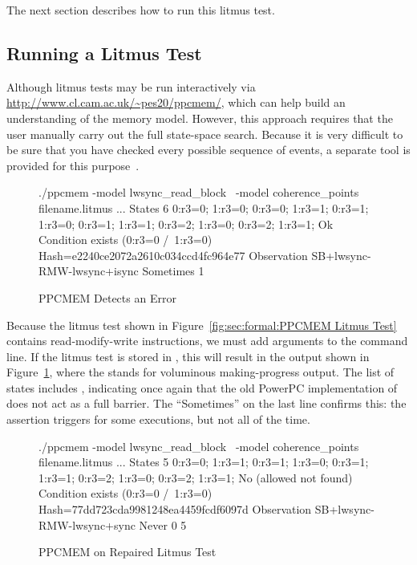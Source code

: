 The next section describes how to run this litmus test.

\subsection{Running a Litmus Test}
\label{sec:formal:Running a Litmus Test}

Although litmus tests may be run interactively via
\url{http://www.cl.cam.ac.uk/~pes20/ppcmem/}, which can help build an
understanding of the memory model.
However, this approach requires that the user manually carry out the
full state-space search.
Because it is very difficult to be sure that you have checked every
possible sequence of events, a separate tool is provided for this
purpose~\cite{PaulEMcKenney2011ppcmem}.

\begin{figure}[tbp]
{ \scriptsize
\begin{verbbox}
./ppcmem -model lwsync_read_block \
         -model coherence_points filename.litmus
...
States 6
0:r3=0; 1:r3=0;
0:r3=0; 1:r3=1;
0:r3=1; 1:r3=0;
0:r3=1; 1:r3=1;
0:r3=2; 1:r3=0;
0:r3=2; 1:r3=1;
Ok
Condition exists (0:r3=0 /\ 1:r3=0)
Hash=e2240ce2072a2610c034ccd4fc964e77
Observation SB+lwsync-RMW-lwsync+isync Sometimes 1
\end{verbbox}
}
\centering
\theverbbox
\caption{PPCMEM Detects an Error}
\label{fig:sec:formal:PPCMEM Detects an Error}
\end{figure}

Because the litmus test shown in
Figure~\ref{fig:sec:formal:PPCMEM Litmus Test}
contains read-modify-write instructions, we must add 
arguments to the command line.
If the litmus test is stored in ,
this will result in the output shown in
Figure~\ref{fig:sec:formal:PPCMEM Detects an Error},
where the  stands for voluminous making-progress output.
The list of states includes \co{0:r3=0; 1:r3=0;}, indicating once again
that the old PowerPC implementation of \co{atomic_add_return()} does
not act as a full barrier.
The ``Sometimes'' on the last line confirms this: the assertion triggers
for some executions, but not all of the time.

\begin{figure}[tbp]
{ \scriptsize
\begin{verbbox}
./ppcmem -model lwsync_read_block \
         -model coherence_points filename.litmus
...
States 5
0:r3=0; 1:r3=1;
0:r3=1; 1:r3=0;
0:r3=1; 1:r3=1;
0:r3=2; 1:r3=0;
0:r3=2; 1:r3=1;
No (allowed not found)
Condition exists (0:r3=0 /\ 1:r3=0)
Hash=77dd723cda9981248ea4459fcdf6097d
Observation SB+lwsync-RMW-lwsync+sync Never 0 5
\end{verbbox}
}
\centering
\theverbbox
\caption{PPCMEM on Repaired Litmus Test}
\label{fig:sec:formal:PPCMEM on Repaired Litmus Test}
\end{figure}

